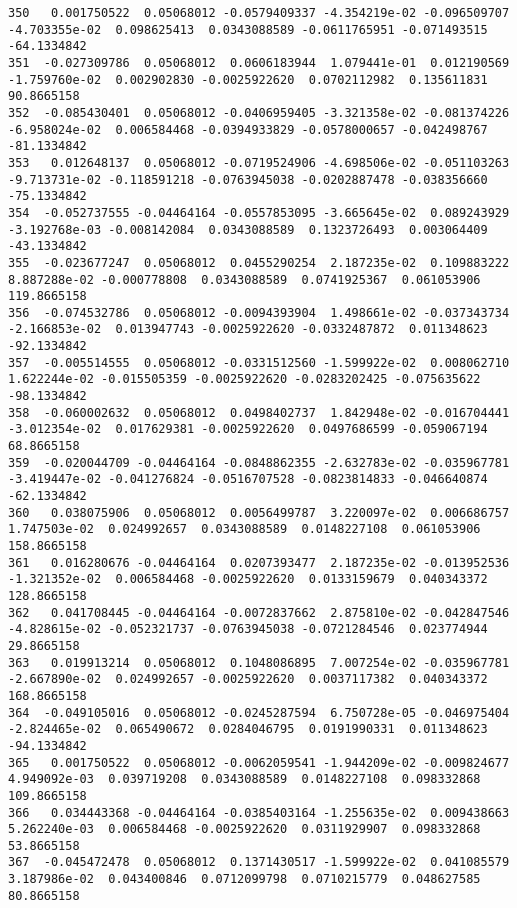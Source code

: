 \documentclass[15pt,a4paper,openright]{article}
\begin{document}
\begin{lstlisting}[language=AMPL, caption = data file]
350   0.001750522  0.05068012 -0.0579409337 -4.354219e-02 -0.096509707 -4.703355e-02  0.098625413  0.0343088589 -0.0611765951 -0.071493515  -64.1334842
351  -0.027309786  0.05068012  0.0606183944  1.079441e-01  0.012190569 -1.759760e-02  0.002902830 -0.0025922620  0.0702112982  0.135611831   90.8665158
352  -0.085430401  0.05068012 -0.0406959405 -3.321358e-02 -0.081374226 -6.958024e-02  0.006584468 -0.0394933829 -0.0578000657 -0.042498767  -81.1334842
353   0.012648137  0.05068012 -0.0719524906 -4.698506e-02 -0.051103263 -9.713731e-02 -0.118591218 -0.0763945038 -0.0202887478 -0.038356660  -75.1334842
354  -0.052737555 -0.04464164 -0.0557853095 -3.665645e-02  0.089243929 -3.192768e-03 -0.008142084  0.0343088589  0.1323726493  0.003064409  -43.1334842
355  -0.023677247  0.05068012  0.0455290254  2.187235e-02  0.109883222  8.887288e-02 -0.000778808  0.0343088589  0.0741925367  0.061053906  119.8665158
356  -0.074532786  0.05068012 -0.0094393904  1.498661e-02 -0.037343734 -2.166853e-02  0.013947743 -0.0025922620 -0.0332487872  0.011348623  -92.1334842
357  -0.005514555  0.05068012 -0.0331512560 -1.599922e-02  0.008062710  1.622244e-02 -0.015505359 -0.0025922620 -0.0283202425 -0.075635622  -98.1334842
358  -0.060002632  0.05068012  0.0498402737  1.842948e-02 -0.016704441 -3.012354e-02  0.017629381 -0.0025922620  0.0497686599 -0.059067194   68.8665158
359  -0.020044709 -0.04464164 -0.0848862355 -2.632783e-02 -0.035967781 -3.419447e-02 -0.041276824 -0.0516707528 -0.0823814833 -0.046640874  -62.1334842
360   0.038075906  0.05068012  0.0056499787  3.220097e-02  0.006686757  1.747503e-02  0.024992657  0.0343088589  0.0148227108  0.061053906  158.8665158
361   0.016280676 -0.04464164  0.0207393477  2.187235e-02 -0.013952536 -1.321352e-02  0.006584468 -0.0025922620  0.0133159679  0.040343372  128.8665158
362   0.041708445 -0.04464164 -0.0072837662  2.875810e-02 -0.042847546 -4.828615e-02 -0.052321737 -0.0763945038 -0.0721284546  0.023774944   29.8665158
363   0.019913214  0.05068012  0.1048086895  7.007254e-02 -0.035967781 -2.667890e-02  0.024992657 -0.0025922620  0.0037117382  0.040343372  168.8665158
364  -0.049105016  0.05068012 -0.0245287594  6.750728e-05 -0.046975404 -2.824465e-02  0.065490672  0.0284046795  0.0191990331  0.011348623  -94.1334842
365   0.001750522  0.05068012 -0.0062059541 -1.944209e-02 -0.009824677  4.949092e-03  0.039719208  0.0343088589  0.0148227108  0.098332868  109.8665158
366   0.034443368 -0.04464164 -0.0385403164 -1.255635e-02  0.009438663  5.262240e-03  0.006584468 -0.0025922620  0.0311929907  0.098332868   53.8665158
367  -0.045472478  0.05068012  0.1371430517 -1.599922e-02  0.041085579  3.187986e-02  0.043400846  0.0712099798  0.0710215779  0.048627585   80.8665158

\end{lstlisting}
\end{document}
